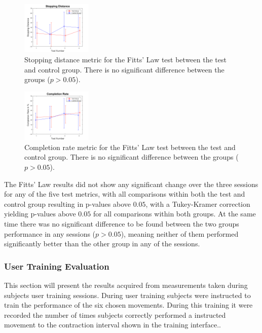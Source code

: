 \begin{figure}[H] 
	\includegraphics[width=0.3\textwidth]{figures/xWesulds/StoppingDistance}
	\caption{Stopping distance metric for the Fitts' Law test between the test and control group. There is no significant difference between the groups ($p > 0.05$).}
	\label{fig:SDresult}
\end{figure} 

\begin{figure}[H] 
	\includegraphics[width=0.3\textwidth]{figures/xWesulds/CompletionRate}
	\caption{Completion rate metric for the Fitts' Law test between the test and control group. There is no significant difference between the groups ($p > 0.05$).}
	\label{fig:CRresult}
\end{figure} 

The Fitts' Law results did not show any significant change over the three sessions for any of the five test metrics, with all comparisons within both the test and control group resulting in p-values above $0.05$, with a Tukey-Kramer correction yielding p-values above $0.05$ for all comparisons within both groups. At the same time there was no significant difference to be found between the two groups performance in any sessions ($p > 0.05$), meaning neither of them performed significantly better than the other group in any of the sessions.

\subsubsection*{User Training Evaluation} \label{sec:R:userTraining}

This section will present the results acquired from measurements taken during subjects user training sessions. During user training subjects were instructed to train the performance of the six chosen movements. During this training it were recorded the number of times subjects correctly performed a instructed movement to the contraction interval shown in the training interface..  

